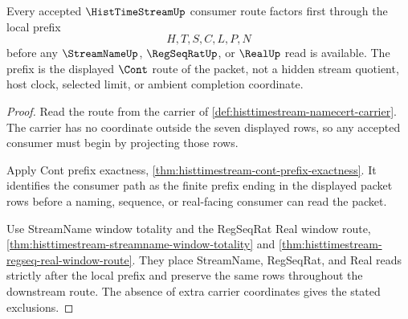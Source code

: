 \begin{theorem}
\label{thm:histtimestream-local-stream-prefix-factorization}
Every accepted $\HistTimeStreamUp$ consumer route factors first through the local prefix
$$
H,T,S,C,L,P,N
$$
before any $\StreamNameUp$, $\RegSeqRatUp$, or $\RealUp$ read is available. The prefix is the displayed $\Cont$ route of the packet, not a hidden stream quotient, host clock, selected limit, or ambient completion coordinate.
\end{theorem}
\begin{proof}
Read the route from the carrier of \autoref{def:histtimestream-namecert-carrier}. The carrier has no coordinate outside the seven displayed rows, so any accepted consumer must begin by projecting those rows.

Apply Cont prefix exactness, \autoref{thm:histtimestream-cont-prefix-exactness}. It identifies the consumer path as the finite prefix ending in the displayed packet rows before a naming, sequence, or real-facing consumer can read the packet.

Use StreamName window totality and the RegSeqRat Real window route, \autoref{thm:histtimestream-streamname-window-totality} and \autoref{thm:histtimestream-regseq-real-window-route}. They place StreamName, RegSeqRat, and Real reads strictly after the local prefix and preserve the same rows throughout the downstream route. The absence of extra carrier coordinates gives the stated exclusions.
\end{proof}

